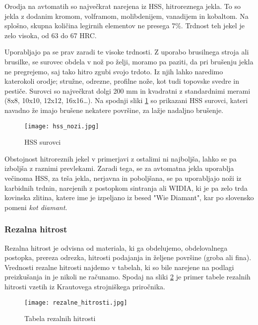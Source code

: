 Orodja na avtomatih so največkrat narejena iz HSS,
hitroreznega jekla. To so jekla z dodanim kromom, volframom,
molibdenijem, vanadijem in kobaltom. Na splošno, skupna količina
legirnih elementov ne presega 7\%. Trdnost teh jekel je zelo visoka,
od 63 do 67 HRC.

Uporabljajo pa se prav zaradi te visoke trdnosti. Z uporabo
brusilnega stroja ali brusilke, se surovec obdela v nož po želji,
moramo pa paziti, da pri brušenju jekla ne pregrejemo, saj tako
hitro zgubi svojo trdoto.
Iz njih lahko naredimo katerokoli orodje; stružne, odrezne,
profilne nože, kot tudi topovske svedre in pestiče. Surovci so
največkrat dolgi 200 mm in kvadratni z standardnimi merami
(8x8, 10x10, 12x12, 16x16…). Na spodnji sliki \ref{hss_nozi}
so prikazani HSS surovci, kateri navadno že imajo brušene
nekatere površine, za lažje nadaljno brušenje.

\begin{figure}[H]
	\begin{center}
		\texttt{[image: hss\_nozi.jpg]}
		\caption{HSS surovci
			\cite{hss_nozi}}
		\label{hss_nozi}
	\end{center}
\end{figure}

Obstojnost hitroreznih jekel v primerjavi z ostalimi ni najboljša,
lahko se pa izboljša z raznimi prevlekami. Zaradi tega, se za
avtomatna jekla uporablja večinoma HSS, za trša jekla, nerjavna
in poboljšana, se pa uporabljajo noži iz karbidnih trdnin,
narejenih z postopkom sintranja ali WIDIA, ki je pa zelo trda
kovinska zlitina, katere ime je izpeljano iz besed "Wie Diamant",
kar po slovensko pomeni \textit{kot diamant}.

\subsubsection{Rezalna hitrost}
Rezalna hitrost je odvisna od materiala, ki ga obdelujemo,
obdelovalnega postopka, prereza odrezka, hitrosti podajanja
in željene površine (groba ali fina). Vrednosti rezalne hitrosti
najdemo v tabelah, ki so bile narejene na podlagi preizkušanja
in je nikoli ne računamo. Spodaj na sliki \ref{rezalna_hitrost}
je primer tabele rezalnih hitrosti vzetih iz Krautovega strojniškega
priročnika.

\begin{figure}[H]
	\begin{center}
		\texttt{[image: rezalne\_hitrosti.jpg]}
		\caption{Tabela rezalnih hitrosti
			\cite{strojniski_prirocnik}}
		\label{rezalna_hitrost}
	\end{center}
\end{figure}

